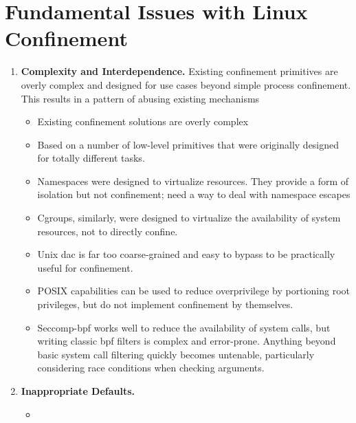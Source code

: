 \section{Fundamental Issues with Linux Confinement}%
\label{s:cp-confinement-issues}

\begin{enumerate}
  \item \textbf{Complexity and Interdependence.}
    Existing confinement primitives are overly complex and designed for use
    cases beyond simple process confinement. This results in a pattern of
    abusing existing mechanisms
  \begin{inprogress}
    \begin{itemize}
      \item Existing confinement solutions are overly complex
      \item Based on a number of low-level primitives that were originally designed for
            totally different tasks.
      \item Namespaces were designed to virtualize resources. They provide a form of
            isolation but not confinement; need a way to deal with namespace escapes
      \item Cgroups, similarly, were designed to virtualize the availability of system
            resources, not to directly confine.
      \item Unix \gls{dac} is far too coarse-grained and easy to bypass to be practically useful for confinement.
      \item POSIX capabilities can be used to reduce overprivilege by portioning root privileges, but do not
            implement confinement by themselves.
      \item Seccomp-bpf works well to reduce the availability of system calls, but writing
            classic \gls{bpf} filters is complex and error-prone. Anything beyond basic system call
            filtering quickly becomes untenable, particularly considering race conditions when
            checking arguments.
    \end{itemize}
  \end{inprogress}

  \item \textbf{Inappropriate Defaults.}
  \begin{inprogress}
    \begin{itemize}
      \item
    \end{itemize}
  \end{inprogress}


\end{enumerate}
